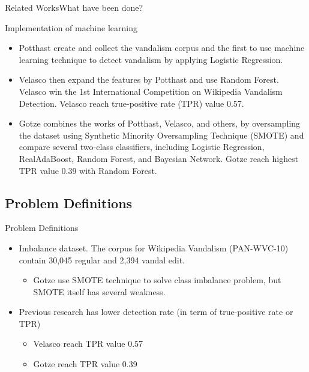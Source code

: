 \documentclass[english]{beamer}
\begin{document}
\begin{frame}{Related Works}{What have been done?}
	\begin{block}{Implementation of machine learning}
		\begin{itemize}
		\item Potthast create and collect the vandalism corpus and the first to
		use machine learning technique to detect vandalism by applying Logistic
		Regression.
		\item Velasco then expand the features by Potthast and use Random
		Forest. Velasco win the 1st International Competition on Wikipedia
		Vandalism Detection. Velasco reach true-positive rate (TPR) value 0.57.
		\item Gotze combines the works of Potthast, Velasco, and others,
		by oversampling the dataset using Synthetic Minority Oversampling
		Technique (SMOTE) and compare several two-class classifiers, including
		Logistic Regression, RealAdaBoost, Random Forest, and Bayesian Network.
		Gotze reach highest TPR value 0.39 with Random Forest.
		\end{itemize}
	\end{block}
\end{frame}

\subsection{Problem Definitions}
\begin{frame}{Problem Definitions}
	\begin{itemize}
		\item Imbalance dataset. The corpus for Wikipedia Vandalism
		(PAN-WVC-10) contain 30,045 regular and 2,394 vandal edit.
			\begin{itemize}
			\item Gotze use SMOTE technique to solve class imbalance problem,
			but SMOTE itself has several weakness.
			\end{itemize}
		\item Previous research has lower detection rate (in term of
		true-positive rate or TPR)
			\begin{itemize}
				\item Velasco reach TPR value 0.57
				\item Gotze reach TPR value 0.39
			\end{itemize}
	\end{itemize}
\end{frame}
\end{document}
